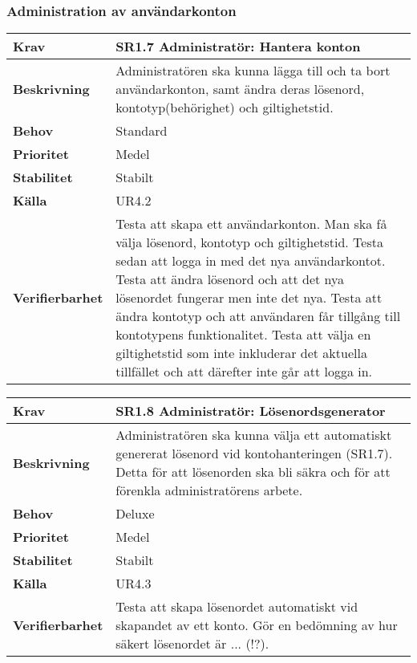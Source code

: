 \documentclass[a4paper, twoside, 11pt, titlepage]{article}
\begin{document}
		\subsubsection{Administration av användarkonton}


		\begin{tabular} { p{2.6cm} p{12.5cm} }
			\hline
			\sffamily\textbf{Krav} & \sffamily\textbf{SR1.7 Administratör: Hantera konton } \\
			\hline
			\sffamily\textbf{Beskrivning} & Administratören ska kunna lägga till och ta bort användarkonton, samt ändra deras lösenord, kontotyp(behörighet) och giltighetstid.  \\
			\hline
			\sffamily\textbf{Behov} & Standard  \\
			\hline
			\sffamily\textbf{Prioritet} & Medel  \\
			\hline
			\sffamily\textbf{Stabilitet} & Stabilt  \\
			\hline
			\sffamily\textbf{Källa} & UR4.2  \\
			\hline
			\sffamily\textbf{Verifierbarhet} & Testa att skapa ett användarkonton. Man ska få välja lösenord, kontotyp och giltighetstid. Testa sedan att logga in med det nya användarkontot. Testa att ändra lösenord och att det nya lösenordet fungerar men inte det nya. Testa att ändra kontotyp och att användaren får tillgång till kontotypens funktionalitet. Testa att välja en giltighetstid som inte inkluderar det aktuella tillfället och att därefter inte går att logga in.  \\
			\hline
		\end{tabular}
		\vspace{6mm}

		\begin{tabular} { p{2.6cm} p{12.5cm} }
			\hline
			\sffamily\textbf{Krav} & \sffamily\textbf{SR1.8 Administratör: Lösenordsgenerator } \\
			\hline
			\sffamily\textbf{Beskrivning} & Administratören ska kunna välja ett automatiskt genererat lösenord vid kontohanteringen (SR1.7). Detta för att lösenorden ska bli säkra och för att förenkla administratörens arbete.  \\
			\hline
			\sffamily\textbf{Behov} & Deluxe  \\
			\hline
			\sffamily\textbf{Prioritet} & Medel  \\
			\hline
			\sffamily\textbf{Stabilitet} & Stabilt  \\
			\hline
			\sffamily\textbf{Källa} & UR4.3  \\
			\hline
			\sffamily\textbf{Verifierbarhet} & Testa att skapa lösenordet automatiskt vid skapandet av ett konto. Gör en bedömning av hur säkert lösenordet är ... (!?).  \\
			\hline
		\end{tabular}
\end{document}
